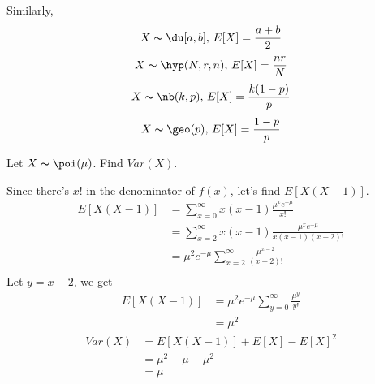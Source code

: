Similarly,
\[ X \thicksim \du[a,b],\, E[X]=\frac{a+b}{2} \]
\[ X \thicksim \hyp(N,r,n),\, E[X]=\frac{nr}{N} \]
\[ X \thicksim \nb(k,p),\,E[X]=\frac{k(1-p)}{p} \]
\[ X \thicksim \geo(p),\,E[X]=\frac{1-p}{p} \]

Let $ X \thicksim \poi(\mu) $. Find $ Var(X) $.

Since there's $ x! $ in the denominator of $ f(x) $, let's find
$ E[X(X-1)] $.
\begin{align*}
    E[X(X-1)]&=\sum\limits_{x=0}^{\infty}x(x-1)\frac{\mu^xe^{-\mu}}{x!}\\
    &=\sum\limits_{x=2}^{\infty}x(x-1)\frac{\mu^xe^{-\mu}}{x(x-1)(x-2)!}\\
    &=\mu^2e^{-\mu}\sum\limits_{x=2}^{\infty} \frac{\mu^{x-2}}{(x-2)!}\\
\end{align*}
Let $ y=x-2 $, we get
\begin{align*}
    E[X(X-1)]&=\mu^2e^{-\mu}\sum\limits_{y=0}^{\infty} \frac{\mu^{y}}{y!}\\
    &=\mu^2
\end{align*}
\begin{align*}
    Var(X)&=E[X(X-1)]+E[X]-E[X]^2\\
    &=\mu^2+\mu-\mu^2\\
    &=\mu
\end{align*}

